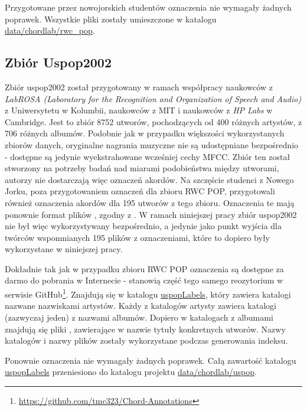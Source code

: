 Przygotowane przez nowojorskich studentów oznaczenia nie wymagały żadnych poprawek. Wszystkie pliki  zostały umieszczone w katalogu \url{data/chordlab/rwc_pop}.

\subsection{Zbiór Uspop2002}

Zbiór uspop2002 \cite{berenzweig_large-scale_2004} został przygotowany w ramach współpracy naukowców z \emph{LabROSA (Laboratory for the Recognition and Organization of Speech and Audio)} z Uniwersytetu w Kolumbii, naukowców z MIT i naukowców z \emph{HP Labs} w Cambridge. Jest to zbiór 8752 utworów, pochodzących od 400 różnych artystów, z 706 różnych albumów. Podobnie jak w przypadku większości wykorzystanych zbiorów danych, oryginalne nagrania muzyczne nie są udostępniane bezpośrednio - dostępne są jedynie wyekstrahowane wcześniej cechy MFCC. Zbiór ten został stworzony na potrzeby badań nad miarami podobieństwa między utworami, autorzy nie dostarczają więc oznaczeń akordów. Na szczęście studenci z Nowego Jorku, poza przygotowaniem oznaczeń dla zbioru RWC POP, przygotowali również oznaczenia akordów dla 195 utworów z tego zbioru. Oznaczenia te mają ponownie format plików , zgodny z \cite{harte_towards_nodate}. W ramach niniejszej pracy zbiór uspop2002 nie był więc wykorzystywany bezpośrednio, a jedynie jako punkt wyjścia dla twórców wspomnianych 195 plików z oznaczeniami, które to dopiero były wykorzystane w niniejszej pracy.

Dokładnie tak jak w przypadku zbioru RWC POP oznaczenia są dostępne za darmo do pobrania w Internecie - stanowią część tego samego reozytorium w serwisie GitHub\footnote{\url{https://github.com/tmc323/Chord-Annotations}}. Znajdują się w katalogu \url{uspopLabels}, który zawiera katalogi nazwane nazwiskami artystów. Każdy z katalogów artysty zawiera katalogi (zazwyczaj jeden) z nazwami albumów. Dopiero w katalogach z albumami znajdują się pliki , zawierające w nazwie tytuły konkretnych utworów. Nazwy katalogów i nazwy plików zostały wykorzystane podczas generowania indeksu.

Ponownie oznaczenia nie wymagały żadnych poprawek. Całą zawartość katalogu \url{uspopLabels} przeniesiono do katalogu projektu \url{data/chordlab/uspop}.

